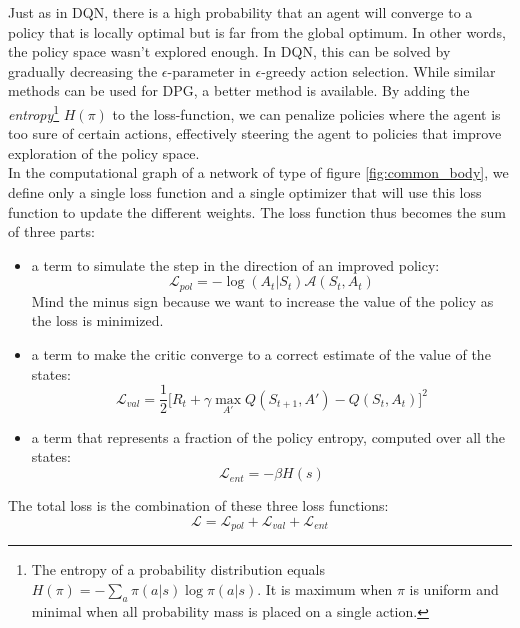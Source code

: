 Just as in DQN, there is a high probability that an agent will converge to a policy that is locally optimal but is far from the global optimum. In other words, the policy space wasn't explored enough. In DQN, this can be solved by gradually decreasing the $\epsilon$-parameter in $\epsilon$-greedy action selection. While similar methods can be used for DPG, a better method is available. By adding the \emph{entropy}\footnote{The entropy of a probability distribution equals $H(\pi) = -\sum_{a} \pi(a|s) \log \pi(a|s)$. It is maximum when $\pi$ is uniform and minimal when all probability mass is placed on a single action.} $H(\pi)$ to the loss-function, we can penalize policies where the agent is too sure of certain actions, effectively steering the agent to policies that improve exploration of the policy space.\\
In the computational graph of a network of type of figure \ref{fig:common_body}, we define only a single loss function and a single optimizer that will use this loss function to update the different weights. The loss function thus becomes the sum of three parts:
\begin{itemize}
    \item a term to simulate the step in the direction of an improved policy:\\ \begin{equation} \mathcal{L}_{pol} = -\log(A_t|S_t) \mathcal{A}(S_t, A_t) \end{equation} Mind the minus sign because we want to increase the value of the policy as the loss is minimized.
    \item a term to make the critic converge to a correct estimate of the value of the states:\\
    \begin{equation} \mathcal{L}_{val} =  \frac{1}{2} \big[ R_t + \gamma \max_{A'} Q(S_{t+1}, A') - Q(S_t, A_t)\big]^2 \end{equation} 
    \item a term that represents a fraction of the policy entropy, computed over all the states:\\ \begin{equation} \mathcal{L}_{ent} = -\beta H(s)\end{equation} 
\end{itemize}
The total loss is the combination of these three loss functions:
\begin{equation}
\mathcal{L} = \mathcal{L}_{pol} + \mathcal{L}_{val} + \mathcal{L}_{ent} 
\end{equation} 

